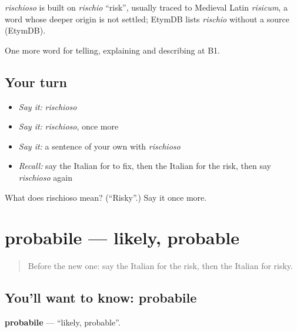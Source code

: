 \begin{cousinweb}
\emph{rischioso} is built on \emph{rischio} \textquotedblleft{}risk\textquotedblright{}, usually traced to Medieval Latin \emph{risicum}, a word whose deeper origin is not settled; EtymDB lists \emph{rischio} without a source (EtymDB).
\end{cousinweb}

\begin{grammarlens}[title={What you've built}]
One more word for telling, explaining and describing at B1.
\end{grammarlens}

\subsection*{Your turn}
\begin{itemize}
\raggedright
  \item \emph{Say it:} \emph{rischioso}
  \item \emph{Say it:} \emph{rischioso}, once more
  \item \emph{Say it:} a sentence of your own with \emph{rischioso}
  \item \emph{Recall:} say the Italian for to fix, then the Italian for the risk, then say \emph{rischioso} again
\end{itemize}

\begin{tcolorbox}[breakable,colback=teal!4,colframe=teal!35!black,title={Before you move on}]
What does rischioso mean? (\textquotedblleft{}Risky\textquotedblright{}.) Say it once more.
\end{tcolorbox}
\section[probabile]{probabile — likely, probable}

\label{lesson:IT-C376-probabile}



\begin{quote}
Before the new one: say the Italian for the risk, then the Italian for risky.
\end{quote}

\subsection*{You'll want to know: probabile}
\textbf{probabile} — \textquotedblleft{}likely, probable\textquotedblright{}.

